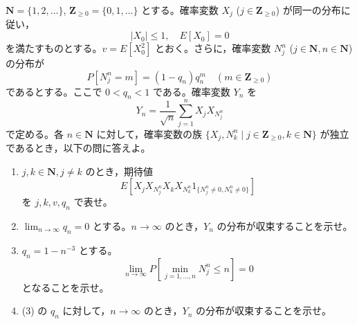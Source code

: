 \documentclass[12pt]{jlreq}
\begin{document}
$\mathbf{N} = \{1, 2, \dots\}$, $\mathbf{Z}_{\ge0} = \{0, 1, \dots\}$ とする。確率変数 $X_j$ ($j \in \mathbf{Z}_{\ge0}$) が同一の分布に従い，
\[
  |X_0| \le 1,\quad E[X_0] = 0
\]
を満たすものとする。$v = E[X_0^2]$ とおく。さらに，確率変数 $N_j^n$ ($j \in \mathbf{N}, n \in \mathbf{N}$) の分布が
\[
  P[N_j^n = m] = (1 - q_n)q_n^m \quad (m \in \mathbf{Z}_{\ge0})
\]
であるとする。ここで $0 < q_n < 1$ である。確率変数 $Y_n$ を
\[
  Y_n = \frac{1}{\sqrt{n}} \sum_{j=1}^n X_j X_{N_j^n}
\]
で定める。各 $n \in \mathbf{N}$ に対して，確率変数の族 $\{X_j, N_k^n \mid j \in \mathbf{Z}_{\ge0}, k \in \mathbf{N}\}$ が独立であるとき，以下の問に答えよ。

\begin{enumerate}
  \item $j, k \in \mathbf{N}, j \ne k$ のとき，期待値
  \[
    E\left[X_j X_{N_j^n} X_k X_{N_k^n} 1_{\{N_j^n \ne 0, N_k^n \ne 0\}}\right]
  \]
  を $j, k, v, q_n$ で表せ。
  \item $\lim_{n \to \infty} q_n = 0$ とする。$n \to \infty$ のとき，$Y_n$ の分布が収束することを示せ。
  \item $q_n = 1 - n^{-3}$ とする。
  \[
    \lim_{n \to \infty} P\left[\min_{j=1,\dots,n} N_j^n \le n\right] = 0
  \]
  となることを示せ。
  \item (3) の $q_n$ に対して，$n \to \infty$ のとき，$Y_n$ の分布が収束することを示せ。
\end{enumerate}
\end{document}
